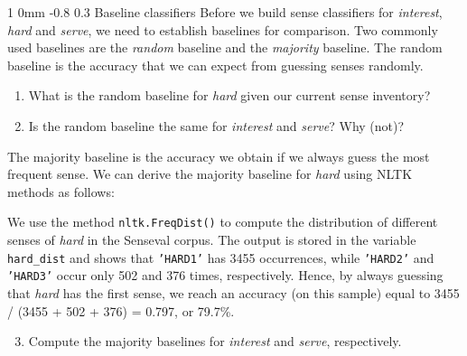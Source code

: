 \documentclass[11pt]{article}
\makeatletter
\newcommand{\newsec}[2]{\section{#1}\label{sec:#2}\noindent}
\renewcommand{\section}{\@startsection
{section}%
{1}%
{0mm}%
{-0.8\baselineskip}%
{0.3\baselineskip}%
{\bfseries\large}}%
\makeatother
\begin{document}
\newsec{Baseline classifiers }{baseline}%
Before we build sense classifiers for \emph{interest}, \emph{hard} and
\emph{serve}, we need to establish baselines for comparison.  Two
commonly used baselines are the \emph{random} baseline and the
\emph{majority} baseline. The random baseline is the accuracy that we
can expect from guessing senses randomly.
\begin{enumerate}[topsep=0.2cm,noitemsep]
\item  What is the random baseline for \emph{hard} given our current
  sense inventory?
\item  Is the random baseline the same for \emph{interest} and
  \emph{serve}? Why (not)?
\end{enumerate}
The majority baseline is the accuracy we obtain if we always guess the
most frequent sense. We can derive the majority baseline for
\emph{hard} using NLTK methods as follows:
\begin{center}
\fbox{
\scalebox{0.9}{

}}
\end{center}
We use the method {\tt nltk.FreqDist()} to compute the distribution of
different senses of \emph{hard} in the Senseval corpus. The output is
stored in the variable {\tt hard\_dist} and shows that {\tt 'HARD1'}
has 3455 occurrences, while {\tt 'HARD2'} and {\tt 'HARD3'} occur only
502 and 376 times, respectively. Hence, by always guessing that
\emph{hard} has the first sense, we reach an accuracy (on this sample)
equal to 3455 / (3455 + 502 + 376) = 0.797, or 79.7\%.
\begin{enumerate}[topsep=0.2cm,noitemsep]
\setcounter{enumi}{2}
\item  Compute the majority baselines for \emph{interest} and \emph{serve}, respectively.
\end{enumerate}
\end{document}

